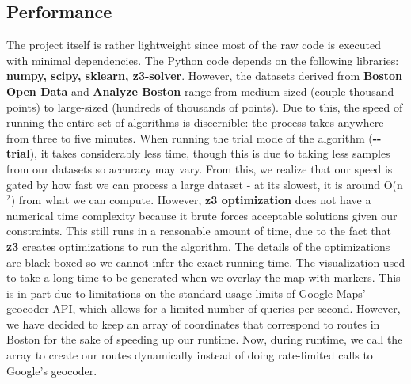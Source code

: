 \documentclass[15pt]{report}
\begin{document}
\subsection*{Performance}
The project itself is rather lightweight since most of the raw code is executed with minimal dependencies. The Python code depends on the following libraries: \textbf{numpy, scipy, sklearn, z3-solver}. However, the datasets derived from \textbf{Boston Open Data} and \textbf{Analyze Boston} range from medium-sized (couple thousand points) to large-sized (hundreds of thousands of points). Due to this, the speed of running the entire set of algorithms is discernible: the process takes anywhere from three to five minutes. When running the trial mode of the algorithm (\textbf{-{}-trial}), it takes considerably less time, though this is due to taking less samples from our datasets so accuracy may vary. From this, we realize that our speed is gated by how fast we can process a large dataset - at its slowest, it is around O(n$^2$) from what we can compute. However, \textbf{z3 optimization} does not have a numerical time complexity because it brute forces acceptable solutions given our constraints. This still runs in a reasonable amount of time, due to the fact that \textbf{z3} creates optimizations to run the algorithm. The details of the optimizations are black-boxed so we cannot infer the exact running time. The visualization used to take a long time to be generated when we overlay the map with markers. This is in part due to limitations on the standard usage limits of Google Maps' geocoder API, which allows for a limited number of queries per second. However, we have decided to keep an array of coordinates that correspond to routes in Boston for the sake of speeding up our runtime. Now, during runtime, we call the array to create our routes dynamically instead of doing rate-limited calls to Google's geocoder. 

\end{document}
